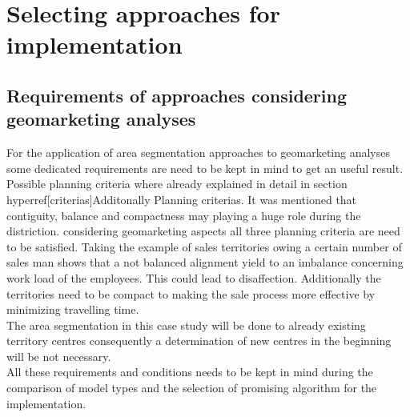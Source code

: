 \section{Selecting approaches for implementation}\label{Selecting}
\subsection{Requirements of approaches considering geomarketing analyses}

For the application of area segmentation approaches to geomarketing analyses some dedicated requirements are need to be kept in mind to get an useful result. Possible planning criteria where already explained in detail in section \label{criterias} hyperref[criterias]{Additonally Planning criterias}. It was mentioned that contiguity, balance and compactness may playing a huge role during the distriction. considering geomarketing aspects all three planning criteria are need to be satisfied. Taking the example of sales territories owing a certain number of sales man shows that a not balanced alignment yield to an imbalance concerning work load of the employees. This could lead to disaffection. Additionally the territories need to be compact to making the sale process more effective by minimizing travelling time. \\
The area segmentation in this case study will be done to already existing territory centres consequently a determination of new centres in the beginning will be not necessary. \\
All these requirements and conditions needs to be kept in mind during the comparison of model types and the selection of promising algorithm for the implementation.



